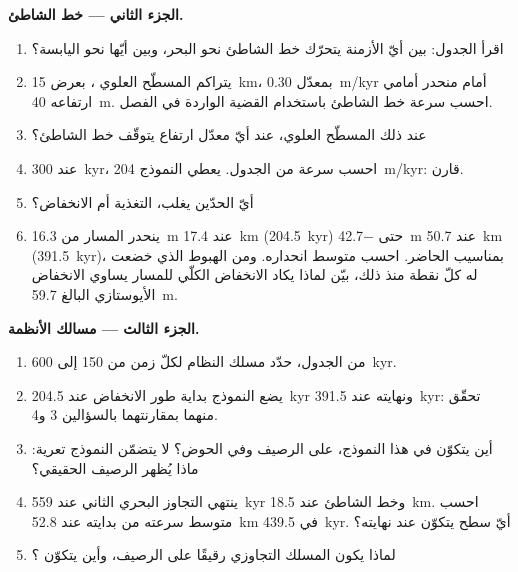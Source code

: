 \begin{problem}
\medskip\noindent\textbf{الجزء الثاني --- خط الشاطئ.}
\begin{enumerate}[resume]
\item اقرأ الجدول: بين أيّ الأزمنة يتحرّك خط الشاطئ نحو البحر،
  وبين أيّها نحو اليابسة؟
\item يتراكم المسطّح العلوي ، بعرض \qty{15}{km}، بمعدّل \qty{0.30}{m/kyr}
  أمام منحدر أمامي ارتفاعه \qty{40}{m}. احسب سرعة خط الشاطئ
  باستخدام القضية الواردة في الفصل.
\item عند ذلك المسطّح العلوي، عند أيّ معدّل ارتفاع يتوقّف خط الشاطئ؟
\item عند \qty{300}{kyr}، احسب سرعة  من
  الجدول. يعطي النموذج \qty{204}{m/kyr}: قارن.
\item أيّ الحدّين يغلب، التغذية أم الانخفاض؟
\item ينحدر المسار من \qty{16.3}{m} عند \qty{17.4}{km}
  (\qty{204.5}{kyr}) حتى \qty{-42.7}{m} عند \qty{50.7}{km}
  (\qty{391.5}{kyr})، بمناسيب الحاضر. احسب متوسط انحداره.
  ومن الهبوط الذي خضعت له كلّ نقطة منذ ذلك، بيّن لماذا يكاد الانخفاض الكلّي للمسار
  يساوي الانخفاض الأيوستازي البالغ \qty{59.7}{m}.
\end{enumerate}

\medskip\noindent\textbf{الجزء الثالث --- مسالك الأنظمة.}
\begin{enumerate}[resume]
\item من الجدول، حدّد مسلك النظام لكلّ زمن من 150
  إلى \qty{600}{kyr}.
\item يضع النموذج بداية طور الانخفاض عند \qty{204.5}{kyr}
  ونهايته عند \qty{391.5}{kyr}: تحقّق منهما بمقارنتهما بالسؤالين 3 و4.
\item أين يتكوّن  في هذا النموذج، على الرصيف وفي
  الحوض؟ لا يتضمّن النموذج تعرية: ماذا يُظهر الرصيف الحقيقي؟
\item ينتهي التجاوز البحري الثاني عند \qty{559}{kyr} وخط الشاطئ عند
  \qty{18.5}{km}. احسب متوسط سرعته من بدايته عند \qty{52.8}{km} في
  \qty{439.5}{kyr}. أيّ سطح يتكوّن عند نهايته؟
\item لماذا يكون المسلك التجاوزي رقيقًا على الرصيف، وأين يتكوّن
  ؟
\end{enumerate}


\end{problem}
